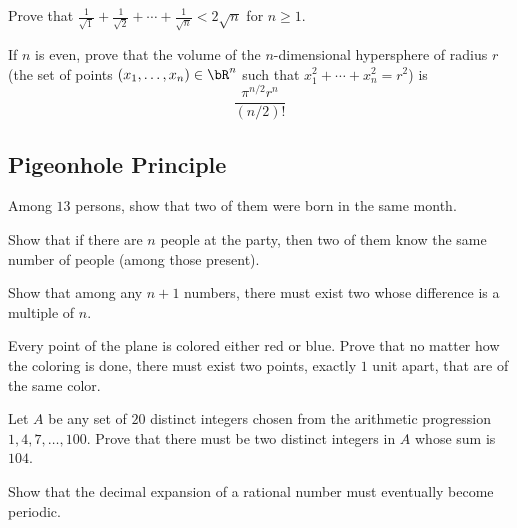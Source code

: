 \documentclass[12pt]{article}
\begin{document}
        \begin{exercise}
            Prove that $\frac{1}{\sqrt{1}}+\frac{1}{\sqrt{2}}+\cdots+\frac{1}{\sqrt{n}}<2\sqrt{n}$ for $n\geq 1$.
        \end{exercise}

        \begin{exercise}
            If $n$ is even, prove that the volume of the $n$-dimensional hypersphere of radius $r$ (the set of points $(x_1,\dots,x_n)\in \bR^n$ such that $x_1^2+\cdots+x_n^2 = r^2$) is
            \[\frac{\pi^{n/2}r^n}{(n/2)!}\]
        \end{exercise}

        

    \subsection{Pigeonhole Principle}

        \begin{exercise}
            Among $13$ persons, show that two of them were born in the same month.
        \end{exercise}
            
        \begin{exercise}
             Show that if there are $n$ people at the party, then two of them know the same number of people (among those present).
            \end{exercise}
            
        \begin{exercise}
            Show that among any $n+1$ numbers, there must exist two whose difference is a multiple of $n$.
        \end{exercise}
            
        \begin{exercise}
            Every point of the plane is colored either red or blue. Prove that no matter how the coloring is done, there must exist two points, exactly $1$ unit apart, that are of the same color.
        \end{exercise}
            
        \begin{exercise}
            Let $A$ be any set of $20$ distinct integers chosen from the arithmetic progression $1,4,7,\dots, 100$. Prove that there must be two distinct integers in $A$ whose sum is $104$.
        \end{exercise}

        \begin{exercise}
            Show that the decimal expansion of a rational number must eventually become periodic.
        \end{exercise}
            
\end{document}
